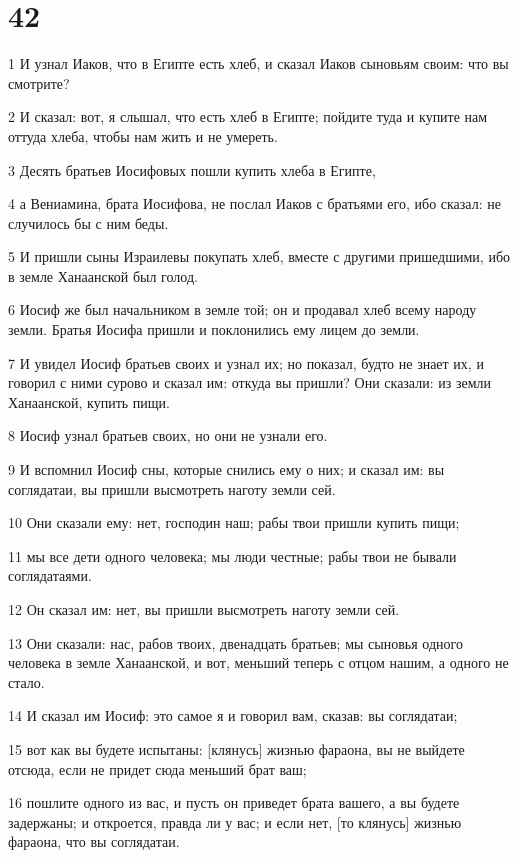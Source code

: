 \chapter{42}

\par 1 И узнал Иаков, что в Египте есть хлеб, и сказал Иаков сыновьям своим: что вы смотрите?
\par 2 И сказал: вот, я слышал, что есть хлеб в Египте; пойдите туда и купите нам оттуда хлеба, чтобы нам жить и не умереть.
\par 3 Десять братьев Иосифовых пошли купить хлеба в Египте,
\par 4 а Вениамина, брата Иосифова, не послал Иаков с братьями его, ибо сказал: не случилось бы с ним беды.
\par 5 И пришли сыны Израилевы покупать хлеб, вместе с другими пришедшими, ибо в земле Ханаанской был голод.
\par 6 Иосиф же был начальником в земле той; он и продавал хлеб всему народу земли. Братья Иосифа пришли и поклонились ему лицем до земли.
\par 7 И увидел Иосиф братьев своих и узнал их; но показал, будто не знает их, и говорил с ними сурово и сказал им: откуда вы пришли? Они сказали: из земли Ханаанской, купить пищи.
\par 8 Иосиф узнал братьев своих, но они не узнали его.
\par 9 И вспомнил Иосиф сны, которые снились ему о них; и сказал им: вы соглядатаи, вы пришли высмотреть наготу земли сей.
\par 10 Они сказали ему: нет, господин наш; рабы твои пришли купить пищи;
\par 11 мы все дети одного человека; мы люди честные; рабы твои не бывали соглядатаями.
\par 12 Он сказал им: нет, вы пришли высмотреть наготу земли сей.
\par 13 Они сказали: нас, рабов твоих, двенадцать братьев; мы сыновья одного человека в земле Ханаанской, и вот, меньший теперь с отцом нашим, а одного не стало.
\par 14 И сказал им Иосиф: это самое я и говорил вам, сказав: вы соглядатаи;
\par 15 вот как вы будете испытаны: [клянусь] жизнью фараона, вы не выйдете отсюда, если не придет сюда меньший брат ваш;
\par 16 пошлите одного из вас, и пусть он приведет брата вашего, а вы будете задержаны; и откроется, правда ли у вас; и если нет, [то клянусь] жизнью фараона, что вы соглядатаи.
